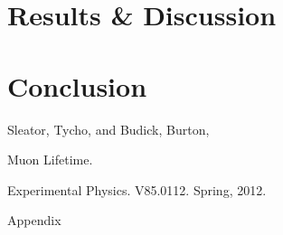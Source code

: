 

\section{Results \& Discussion}

\section{Conclusion}
%

\begin{thebibliography}{99}
Sleator, Tycho, and Budick, Burton, \begin{em}Muon Lifetime. \end{em}Experimental Physics. V85.0112. Spring, 2012.
\end{thebibliography}

\newpage \LARGE{Appendix}

  
